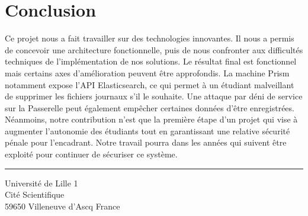 \chapter*{Conclusion}
\label{sec:conclusion}

Ce projet nous a fait travailler sur des technologies innovantes. Il nous a permis de concevoir une architecture fonctionnelle, puis de nous confronter aux difficultés techniques de l'implémentation de nos solutions. Le résultat final est fonctionnel mais certains axes d'amélioration peuvent être approfondis. La machine Prism notamment expose l'API Elasticsearch, ce qui permet à un étudiant malveillant de supprimer les fichiers journaux s'il le souhaite. Une attaque par déni de service sur la Passerelle peut également empêcher certaines données d'être enregistrées. Néanmoins, notre contribution n'est que la première étape d'un projet qui vise à augmenter l'autonomie des étudiants tout en garantissant une relative sécurité pénale pour l'encadrant. Notre travail pourra dans les années qui suivent être exploité pour continuer de sécuriser ce système. 

\appendix

\noindent\rule[2pt]{\textwidth}{0.5pt}
\begin{center}
  Université de Lille 1\\
  Cité Scientifique\\
  59650 Villeneuve d'Ascq France
\end{center}
\vspace*{\fill}

